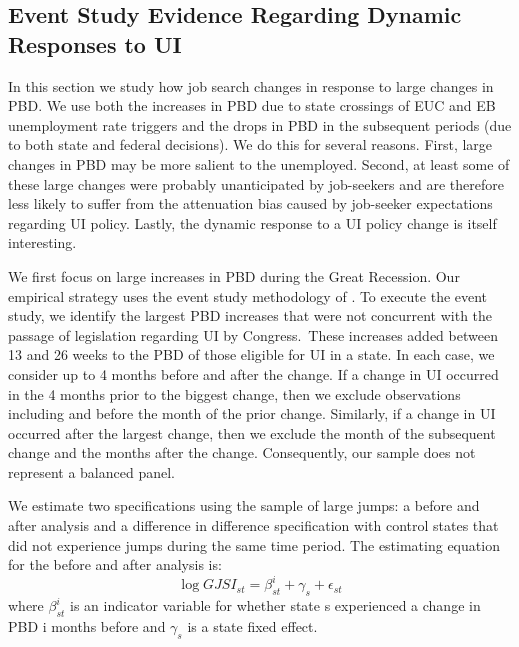 \documentclass[12pt]{article}
\begin{document}
\begin{spacing}{2}
\subsection{Event Study Evidence Regarding Dynamic Responses to UI}
In this section we study how job search changes in response to large changes in PBD. We use both the increases in PBD due to state crossings of EUC and EB unemployment rate triggers and the drops in PBD in the subsequent periods (due to both state and federal decisions). We do this for several reasons. First, large changes in PBD may be more salient to the unemployed. Second, at least some of these large changes were probably unanticipated by job-seekers and are therefore less likely to suffer from the attenuation bias caused by job-seeker expectations regarding UI policy. Lastly, the dynamic response to a UI policy change is itself interesting.

We first focus on large increases in PBD during the Great Recession. Our empirical strategy uses the event study methodology of \citet{Marinescu2015}. To execute the event study, we identify the largest PBD increases that were not concurrent with the passage of legislation regarding UI by Congress.\footnotemark \ These increases added between 13 and 26 weeks to the PBD of those eligible for UI in a state. In each case, we consider up to 4 months before and after the change. If a change in UI occurred in the 4 months prior to the biggest change, then we exclude observations including and before the month of the prior change. Similarly, if a change in UI occurred after the largest change, then we exclude the month of the subsequent change and the months after the change. Consequently, our sample does not represent a balanced panel.

We estimate two specifications using the sample of large jumps: a before and after analysis and a difference in difference specification with control states that did not experience jumps during the same time period. The estimating equation for the before and after analysis is:
\begin{equation}\label{eqn:befandaf}
\log{GJSI_{st}} = \beta^{i}_{st} + \gamma_{s} + \epsilon_{st}
\end{equation}
where $\beta^{i}_{st}$ is an indicator variable for whether state s experienced a change in PBD i months before and $\gamma_{s}$ is a state fixed effect. 


\end{spacing}
\end{document}
